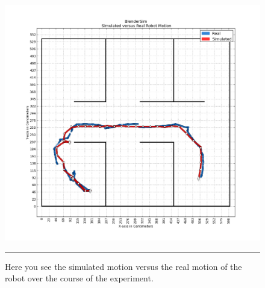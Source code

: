 \begin{figure}[htbp]
\centering
\includegraphics[width=6in]{../Figures/Chapter5/simulated_vs_real_w_physics.png}
\rule{35em}{0.5pt}
\caption[Simulated vs. Real Robot Motion]{Here you see the simulated motion versus the real motion of the robot over the course of the experiment.}
\label{fig:simulated_vs_real_w_physics}
\end{figure}

